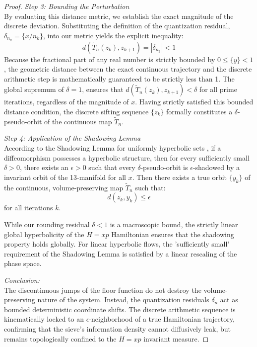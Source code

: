 \documentclass[sn-mathphys-num, pdflatex, referee]{sn-jnl}
\begin{document}
\begin{proof}
\textit{Step 3: Bounding the Perturbation}\\
By evaluating this distance metric, we establish the exact magnitude of the discrete deviation. Substituting the definition of the quantization residual, $\delta_{n_k} = \{x/n_k\}$, into our metric yields the explicit inequality:
\begin{equation}
d(\tilde{T}_n(z_k), z_{k+1}) = |\delta_{n_k}| < 1
\end{equation}
Because the fractional part of any real number is strictly bounded by $0 \le \{y\} < 1$, the geometric distance between the exact continuous trajectory and the discrete arithmetic step is mathematically guaranteed to be strictly less than 1. The global supremum of $\delta = 1$, ensures that $d(\tilde{T}_n(z_k), z_{k+1}) < \delta$ for all prime iterations, regardless of the magnitude of $x$. Having strictly satisfied this bounded distance condition, the discrete sifting sequence $\{z_k\}$ formally constitutes a $\delta$-pseudo-orbit of the continuous map $\tilde{T}_n$.

\textit{Step 4: Application of the Shadowing Lemma}\\
According to the Shadowing Lemma for uniformly hyperbolic sets \cite{katok1995modern}, if a diffeomorphism possesses a hyperbolic structure, then for every sufficiently small $\delta > 0$, there exists an $\epsilon > 0$ such that every $\delta$-pseudo-orbit is $\epsilon$-shadowed by a invariant orbit of the 13-manifold for all $x$. Then there exists a true orbit $\{y_k\}$ of the continuous, volume-preserving map $\tilde{T}_n$ such that:
\begin{equation}
d(z_k, y_k) \le \epsilon
\end{equation}
for all iterations $k$. 

While our rounding residual $\delta < 1$ is a macroscopic bound, the strictly linear global hyperbolicity of the $H=xp$ Hamiltonian ensures that the shadowing property holds globally. For linear hyperbolic flows, the 'sufficiently small' requirement of the Shadowing Lemma  is satisfied by a linear rescaling of the phase space.  

\textit{Conclusion:}\\
The discontinuous jumps of the floor function do not destroy the volume-preserving nature of the system. Instead, the quantization residuals $\delta_n$ act as bounded deterministic coordinate shifts. The discrete arithmetic sequence is kinematically locked to an $\epsilon$-neighborhood of a true Hamiltonian trajectory, confirming that the sieve's information density cannot diffusively leak, but remains topologically confined to the $H=xp$ invariant measure.
\end{proof}
\end{document}
